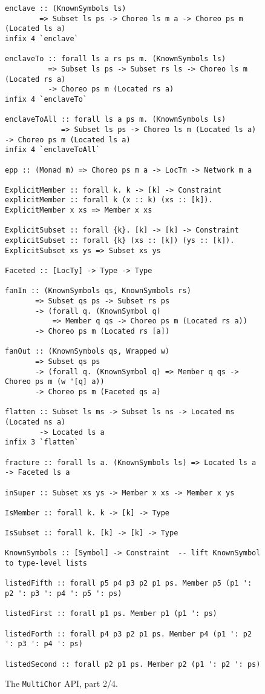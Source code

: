 \documentclass[sigplan,screen]{acmart}
\newcommand{\MultiChor}{\texttt{Multi\-Chor}\xspace}
\begin{document}
\begin{figure*}\ContinuedFloat
\begin{mdframed}
\begin{verbatim}
enclave :: (KnownSymbols ls)
        => Subset ls ps -> Choreo ls m a -> Choreo ps m (Located ls a)
infix 4 `enclave`

enclaveTo :: forall ls a rs ps m. (KnownSymbols ls)
          => Subset ls ps -> Subset rs ls -> Choreo ls m (Located rs a)
          -> Choreo ps m (Located rs a)
infix 4 `enclaveTo`

enclaveToAll :: forall ls a ps m. (KnownSymbols ls)
             => Subset ls ps -> Choreo ls m (Located ls a) -> Choreo ps m (Located ls a)
infix 4 `enclaveToAll`

epp :: (Monad m) => Choreo ps m a -> LocTm -> Network m a

ExplicitMember :: forall k. k -> [k] -> Constraint
explicitMember :: forall k (x :: k) (xs :: [k]). ExplicitMember x xs => Member x xs

ExplicitSubset :: forall {k}. [k] -> [k] -> Constraint
explicitSubset :: forall {k} (xs :: [k]) (ys :: [k]). ExplicitSubset xs ys => Subset xs ys

Faceted :: [LocTy] -> Type -> Type

fanIn :: (KnownSymbols qs, KnownSymbols rs)
       => Subset qs ps -> Subset rs ps
       -> (forall q. (KnownSymbol q)
           => Member q qs -> Choreo ps m (Located rs a))
       -> Choreo ps m (Located rs [a])

fanOut :: (KnownSymbols qs, Wrapped w)
       => Subset qs ps
       -> (forall q. (KnownSymbol q) => Member q qs -> Choreo ps m (w '[q] a))
       -> Choreo ps m (Faceted qs a)

flatten :: Subset ls ms -> Subset ls ns -> Located ms (Located ns a)
        -> Located ls a
infix 3 `flatten`

fracture :: forall ls a. (KnownSymbols ls) => Located ls a -> Faceted ls a

inSuper :: Subset xs ys -> Member x xs -> Member x ys

IsMember :: forall k. k -> [k] -> Type

IsSubset :: forall k. [k] -> [k] -> Type

KnownSymbols :: [Symbol] -> Constraint  -- lift KnownSymbol to type-level lists

listedFifth :: forall p5 p4 p3 p2 p1 ps. Member p5 (p1 ': p2 ': p3 ': p4 ': p5 ': ps)

listedFirst :: forall p1 ps. Member p1 (p1 ': ps)

listedForth :: forall p4 p3 p2 p1 ps. Member p4 (p1 ': p2 ': p3 ': p4 ': ps)

listedSecond :: forall p2 p1 ps. Member p2 (p1 ': p2 ': ps)
\end{verbatim}
\caption{The \MultiChor API, part 2/4.}
\end{mdframed}
\end{figure*}
\end{document}
